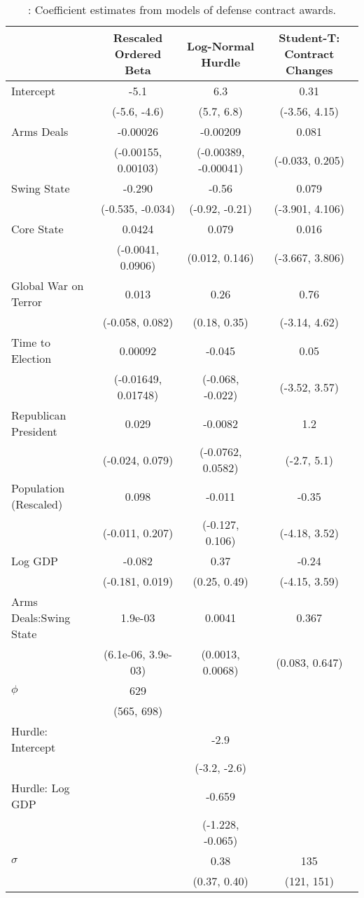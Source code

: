 
\begin{longtable}[t]{lccc}
\caption{\label{tab:cont-regs}: Coefficient estimates from models of defense contract awards.}\\
\toprule
  & Rescaled Ordered Beta & Log-Normal Hurdle & Student-T: Contract Changes\\
\midrule
Intercept & -5.1 & 6.3 & 0.31\\
 & (-5.6, -4.6) & (5.7, 6.8) & (-3.56, 4.15)\\
Arms Deals & -0.00026 & -0.00209 & 0.081\\
 & (-0.00155, 0.00103) & (-0.00389, -0.00041) & (-0.033, 0.205)\\
Swing State & -0.290 & -0.56 & 0.079\\
 & (-0.535, -0.034) & (-0.92, -0.21) & (-3.901, 4.106)\\
Core State & 0.0424 & 0.079 & 0.016\\
 & (-0.0041, 0.0906) & (0.012, 0.146) & (-3.667, 3.806)\\
Global War on Terror & 0.013 & 0.26 & 0.76\\
 & (-0.058, 0.082) & (0.18, 0.35) & (-3.14, 4.62)\\
Time to Election & 0.00092 & -0.045 & 0.05\\
 & (-0.01649, 0.01748) & (-0.068, -0.022) & (-3.52, 3.57)\\
Republican President & 0.029 & -0.0082 & 1.2\\
 & (-0.024, 0.079) & (-0.0762, 0.0582) & (-2.7, 5.1)\\
Population (Rescaled) & 0.098 & -0.011 & -0.35\\
 & (-0.011, 0.207) & (-0.127, 0.106) & (-4.18, 3.52)\\
Log GDP & -0.082 & 0.37 & -0.24\\
 & (-0.181, 0.019) & (0.25, 0.49) & (-4.15, 3.59)\\
Arms Deals:Swing State & 1.9e-03 & 0.0041 & 0.367\\
 & (6.1e-06, 3.9e-03) & (0.0013, 0.0068) & (0.083, 0.647)\\
$\phi$ & 629 &  & \\
 & (565, 698) &  & \\
Hurdle: Intercept &  & -2.9 & \\
 &  & (-3.2, -2.6) & \\
Hurdle: Log GDP &  & -0.659 & \\
 &  & (-1.228, -0.065) & \\
$\sigma$ &  & 0.38 & 135\\
 &  & (0.37, 0.40) & (121, 151)\\
\bottomrule
\end{longtable}
